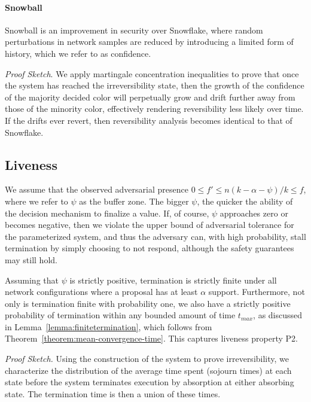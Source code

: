 \documentclass[letterpaper,twocolumn,10pt]{article}
\theoremstyle{definition}
\begin{document}
\paragraph{Snowball}
Snowball is an improvement in security over Snowflake, where random perturbations in network samples are reduced by introducing a limited form of history, which we refer to as confidence. 

\noindent \emph{Proof Sketch}. We apply martingale concentration inequalities to prove that once the system has reached the irreversibility state, then the growth of the confidence of the majority decided color will perpetually grow and drift further away from those of the minority color, effectively rendering reversibility less likely over time. If the drifts ever revert, then reversibility analysis becomes identical to that of Snowflake.  

\subsection{Liveness}

We assume that the observed adversarial presence $0 \leq f' \leq n(k - \alpha - \psi)/k \leq f$, where we refer to $\psi$ as the buffer zone. 
The bigger $\psi$, the quicker the ability of the decision mechanism to finalize a value. 
If, of course, $\psi$ approaches zero or becomes negative, then we violate the upper bound of adversarial tolerance for the parameterized system, and thus the adversary can, with high probability, stall termination by simply choosing to not respond, although the safety guarantees may still hold. 

Assuming that $\psi$ is strictly positive, termination is strictly finite under all network configurations where a proposal has at least $\alpha$ support. Furthermore, not only is termination finite with probability one, we also have a strictly positive probability of termination within any bounded amount of time $t_{max}$, as discussed in Lemma~\ref{lemma:finitetermination}, which follows from Theorem~\ref{theorem:mean-convergence-time}. This captures liveness property P2. 

\noindent\emph{Proof Sketch.} Using the construction of the system to prove irreversibility, we characterize the distribution of the average time spent (sojourn times) at each state before the system terminates execution by absorption at either absorbing state. The termination time is then a union of these times. 
\end{document}
